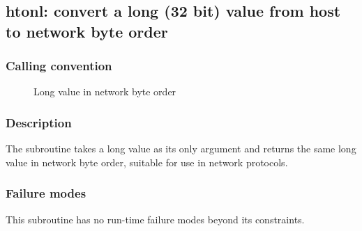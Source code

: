 \clearpage
{}
{}
\label{subr:htonl}
\subsection*{htonl: convert  a  long (32 bit)  value from host to network byte order}

\subsubsection*{Calling convention}

\begin{description}
\item[] Long value in network byte order
\end{description}

\subsubsection*{Description}

The  subroutine takes a long value as its only
argument and returns the same long value in network byte order,
suitable for use in network protocols.

\subsubsection*{Failure modes}

This subroutine has no run-time failure modes beyond its constraints.
